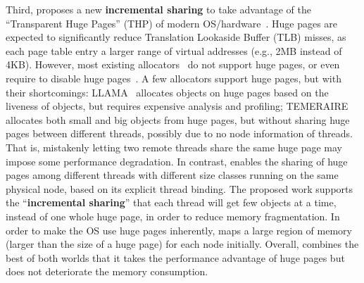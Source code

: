 Third, \NM{} proposes a new \textbf{incremental sharing} to take advantage of the ``Transparent Huge Pages'' (THP) of modern OS/hardware~\cite{hugepage}. Huge pages are expected to significantly reduce Translation Lookaside Buffer (TLB) misses, as each page table entry  a larger range of virtual addresses (e.g., 2MB instead of 4KB). However, most existing allocators~\cite{dlmalloc, Hoard, Scalloc} do not support huge pages, or even require to disable huge pages~\cite{scallochugepage}. A few allocators support huge pages, but with their shortcomings: LLAMA~\cite{LLAMA} allocates objects on huge pages based on the liveness of objects, but requires expensive analysis and profiling;  TEMERAIRE~\cite{TEMERAIRE} allocates both small and big objects from huge pages, but without sharing huge pages between different threads, possibly due to no node information of threads. That is, mistakenly letting two remote threads share the same huge page may impose some performance degradation.  
In contrast, \NM{} enables the sharing of huge pages among different threads with different size classes running on the same physical node, based on its explicit thread binding. 
The proposed work supports the ``\textbf{incremental sharing}'' that each thread will get few objects at a time, instead of one whole huge page, in order to reduce memory fragmentation. 
In order to make the OS use huge pages inherently, \NM{} maps a large region of memory (larger than the size of a huge page) for each node initially. Overall, \NM{} combines the best of both worlds that it takes the performance advantage of huge pages but does not deteriorate the memory consumption. 


